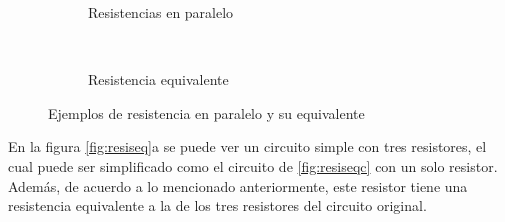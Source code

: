 \begin{figure}[h]
     \centering
     \begin{subfigure}{0.35\textwidth}
         
         \caption{Resistencias en paralelo}
         
     \end{subfigure}\hspace{1em}
     \begin{subfigure}{0.35\textwidth}         
         
        \
         \caption{Resistencia equivalente}        
     \end{subfigure}
     
     
        \caption{Ejemplos de resistencia en paralelo y su equivalente}
        
        \label{fig:rParalelo}
\end{figure}



    
En la figura \ref{fig:resiseq}a se puede ver un circuito simple con tres resistores, el cual puede ser simplificado como el circuito de \ref{fig:resiseqc} con un solo resistor. Además, de acuerdo a lo mencionado anteriormente, este resistor tiene una resistencia equivalente a la de los tres resistores del circuito original.

